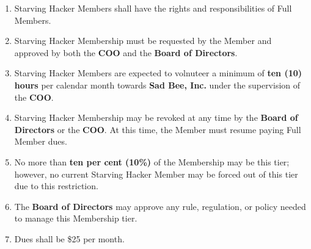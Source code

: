 \documentclass[11pt, oneside]{article}   	%
\begin{document}
\begin{enumerate}
	\begin{enumerate}
		\item Starving Hacker Members shall have the rights and responsibilities of Full Members.
		\item Starving Hacker Membership must be requested by the Member and approved by both the \textbf{COO} and the \textbf{Board of Directors}.
		\item Starving Hacker Members are expected to volnuteer a minimum of \textbf{ten (10) hours} per calendar month towards \textbf{Sad Bee, Inc.} under the supervision of the \textbf{COO}.
		\item Starving Hacker Membership may be revoked at any time by the \textbf{Board of Directors} or the \textbf{COO}.  At this time, the Member must resume paying Full Member dues.
		\item No more than \textbf{ten per cent (10\%)} of the Membership may be this tier; however, no current Starving Hacker Member may be forced out of this tier due to this restriction.
		\item The \textbf{Board of Directors} may approve any rule, regulation, or policy needed to manage this Membership tier.
		\item Dues shall be \$25 per month.
  \end{enumerate}
\end{enumerate}
\end{document}
